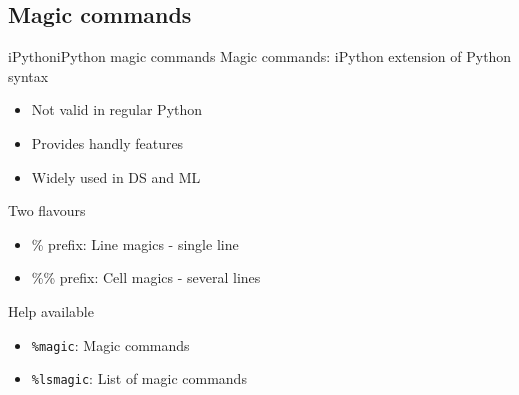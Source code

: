 \documentclass[10pt,compress]{beamer} %
\begin{document}
\subsection{Magic commands}
\begin{frame}{iPython}{iPython magic commands}
	Magic commands: iPython extension of Python syntax
	\begin{itemize}
	\item Not valid in regular Python
	\item Provides handly features
	\item Widely used in DS and ML
	\end{itemize}
	Two flavours
	\begin{itemize}
	\item \% prefix: Line magics - single line
	\item \%\% prefix: Cell magics - several lines
	\end{itemize}
	Help available
	\begin{itemize}
		\item \texttt{\%magic}: Magic commands
		\item \texttt{\%lsmagic}: List of magic commands
	\end{itemize}
\end{frame}
\end{document}
